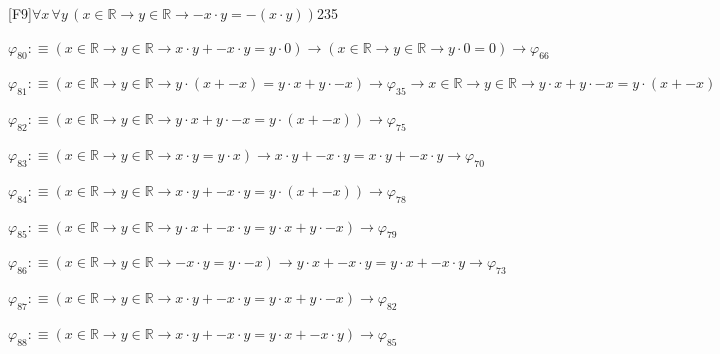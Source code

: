 \begin{fullproof}{[F9]}{$\forall x\,\forall y\,(x \in \mathbb{R} \to y \in \mathbb{R} \to -x \cdot y = -(x \cdot y))$}{235}
\begin{abbrevlist}
\item $\varphi_{80} :\equiv (x \in \mathbb{R} \to y \in \mathbb{R} \to x \cdot y + -x \cdot y = y \cdot 0) \to (x \in \mathbb{R} \to y \in \mathbb{R} \to y \cdot 0 = 0) \to \varphi_{66}$
\item $\varphi_{81} :\equiv (x \in \mathbb{R} \to y \in \mathbb{R} \to y \cdot (x + -x) = y \cdot x + y \cdot -x) \to \varphi_{35} \to x \in \mathbb{R} \to y \in \mathbb{R} \to y \cdot x + y \cdot -x = y \cdot (x + -x)$
\item $\varphi_{82} :\equiv (x \in \mathbb{R} \to y \in \mathbb{R} \to y \cdot x + y \cdot -x = y \cdot (x + -x)) \to \varphi_{75}$
\item $\varphi_{83} :\equiv (x \in \mathbb{R} \to y \in \mathbb{R} \to x \cdot y = y \cdot x) \to x \cdot y + -x \cdot y = x \cdot y + -x \cdot y \to \varphi_{70}$
\item $\varphi_{84} :\equiv (x \in \mathbb{R} \to y \in \mathbb{R} \to x \cdot y + -x \cdot y = y \cdot (x + -x)) \to \varphi_{78}$
\item $\varphi_{85} :\equiv (x \in \mathbb{R} \to y \in \mathbb{R} \to y \cdot x + -x \cdot y = y \cdot x + y \cdot -x) \to \varphi_{79}$
\item $\varphi_{86} :\equiv (x \in \mathbb{R} \to y \in \mathbb{R} \to -x \cdot y = y \cdot -x) \to y \cdot x + -x \cdot y = y \cdot x + -x \cdot y \to \varphi_{73}$
\item $\varphi_{87} :\equiv (x \in \mathbb{R} \to y \in \mathbb{R} \to x \cdot y + -x \cdot y = y \cdot x + y \cdot -x) \to \varphi_{82}$
\item $\varphi_{88} :\equiv (x \in \mathbb{R} \to y \in \mathbb{R} \to x \cdot y + -x \cdot y = y \cdot x + -x \cdot y) \to \varphi_{85}$
\end{abbrevlist}
\end{fullproof}
